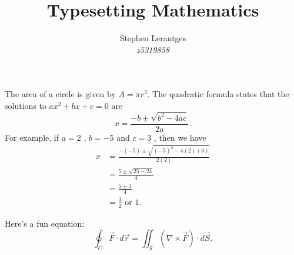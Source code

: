 \documentclass [12pt]{article}
\title{Typesetting Mathematics}
\author{Stephen Lerantges\\\textit{z5319858}}
\begin{document}
\maketitle
The area of a circle is given by $ A = \pi r ^2$.
The quadratic formula states that the solutions to \( ax ^2 + bx + c = 0\) are \[ x = \frac{-b \pm \sqrt{ b ^2 -4 ac }}{2 a }. \]
For example, if $a = 2$ , $ b = -5$ and $c = 3$ , then we have
\begin{align*}
x &= \frac{ -( -5) \pm \sqrt{( -5) ^2 - 4(2) (3) }}{2(2) }\\
&= \frac{5 \pm \sqrt{25 -24}}{4}\\
&= \frac{5 \pm 1}{4}\\
&= \frac{3}{2} \text { or } 1.
\end{align*}

Here's a fun equation:
\[\oint_C \vec{F} \cdot d\vec{r} = \iint_S (\nabla \times \vec{F}) \cdot d\vec{S}.\]
\end{document}
